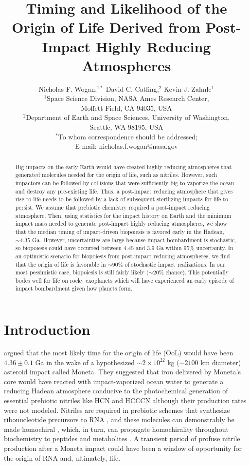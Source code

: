 \documentclass{Liebert_Author}
\title{Timing and Likelihood of the Origin of Life Derived from Post-Impact Highly Reducing Atmospheres}
\author{Nicholas F. Wogan,$^{1\ast}$ David C. Catling,$^{2}$ Kevin J. Zahnle$^{1}$\\
{$^{1}$Space Science Division, NASA Ames Research Center,}\\
{Moffett Field, CA 94035, USA}\\
{$^{2}$Department of Earth and Space Sciences, University of Washington,}\\
{Seattle, WA 98195, USA}\\
{$^\ast$To whom correspondence should be addressed;}\\
{E-mail: nicholas.f.wogan@nasa.gov}
}
\begin{document}
 

\maketitle 

\begin{abstract}
  Big impacts on the early Earth would have created highly reducing atmospheres that generated molecules needed for the origin of life, such as nitriles. However, such impactors can be followed by collisions that were sufficiently big to vaporize the ocean and destroy any pre-existing life. Thus, a post-impact reducing atmosphere that gives rise to life needs to be followed by a lack of subsequent sterilizing impacts for life to persist. We assume that prebiotic chemistry required a post-impact reducing atmosphere. Then, using statistics for the impact history on Earth and the minimum impact mass needed to generate post-impact highly reducing atmospheres, we show that the median timing of impact-driven biopoiesis is favored early in the Hadean, $\sim 4.35$ Ga. However, uncertainties are large because impact bombardment is stochastic, so biopoiesis could have occurred between 4.45 and 3.9 Ga within 95\% uncertainty. In an optimistic scenario for biopoiesis from post-impact reducing atmospheres, we find that the origin of life is favorable in $\sim 90\%$ of stochastic impact realizations. In our most pessimistic case, biopoiesis is still fairly likely ($\sim 20\%$ chance). This potentially bodes well for life on rocky exoplanets which will have experienced an early episode of impact bombardment given how planets form.
\end{abstract}

\section{Introduction}

\citet{Benner_2020} argued that the most likely time for the origin of life (OoL) would have been $4.36 \pm 0.1$ Ga in the wake of a hypothesized $\sim 2 \times 10^{22}$ kg ($\sim 2100$ km diameter) asteroid impact called Moneta. They suggested that iron delivered by Moneta's core would have reacted with impact-vaporized ocean water to generate a reducing Hadean atmosphere conducive to the photochemical generation of essential prebiotic nitriles like HCN and HCCCN although their production rates were not modeled. Nitriles are required in prebiotic schemes that synthesize ribonucleotide precursors to RNA \citep{Patel_2015,Powner_2009,Becker_2019}, and these molecules can demonstrably be made homochiral \citep{Ozturk_2023a}, which, in turn, can propagate homochirality throughout biochemistry to peptides and metabolites \citep{Ozturk_2023b}. A transient period of profuse nitrile production after a Moneta impact could have been a window of opportunity for the origin of RNA and, ultimately, life.
\end{document}
